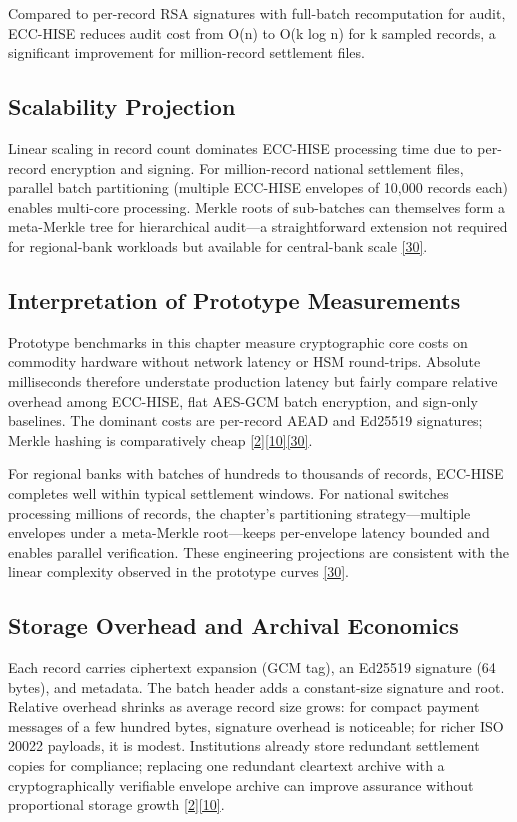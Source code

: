 \indent Compared to per-record RSA signatures with full-batch recomputation for audit, ECC-HISE reduces audit cost from O(n) to O(k log n) for k sampled records, a significant improvement for million-record settlement files.

\subsection{Scalability Projection}

\indent Linear scaling in record count dominates ECC-HISE processing time due to per-record encryption and signing. For million-record national settlement files, parallel batch partitioning (multiple ECC-HISE envelopes of 10,000 records each) enables multi-core processing. Merkle roots of sub-batches can themselves form a meta-Merkle tree for hierarchical audit---a straightforward extension not required for regional-bank workloads but available for central-bank scale \hyperref[ref:30]{[30]}.

\subsection{Interpretation of Prototype Measurements}

\indent Prototype benchmarks in this chapter measure cryptographic core costs on commodity hardware without network latency or HSM round-trips. Absolute milliseconds therefore understate production latency but fairly compare relative overhead among ECC-HISE, flat AES-GCM batch encryption, and sign-only baselines. The dominant costs are per-record AEAD and Ed25519 signatures; Merkle hashing is comparatively cheap \hyperref[ref:2]{[2]}\hyperref[ref:10]{[10]}\hyperref[ref:30]{[30]}.

\indent For regional banks with batches of hundreds to thousands of records, ECC-HISE completes well within typical settlement windows. For national switches processing millions of records, the chapter's partitioning strategy---multiple envelopes under a meta-Merkle root---keeps per-envelope latency bounded and enables parallel verification. These engineering projections are consistent with the linear complexity observed in the prototype curves \hyperref[ref:30]{[30]}.

\subsection{Storage Overhead and Archival Economics}

\indent Each record carries ciphertext expansion (GCM tag), an Ed25519 signature (64 bytes), and metadata. The batch header adds a constant-size signature and root. Relative overhead shrinks as average record size grows: for compact payment messages of a few hundred bytes, signature overhead is noticeable; for richer ISO 20022 payloads, it is modest. Institutions already store redundant settlement copies for compliance; replacing one redundant cleartext archive with a cryptographically verifiable envelope archive can improve assurance without proportional storage growth \hyperref[ref:2]{[2]}\hyperref[ref:10]{[10]}.

